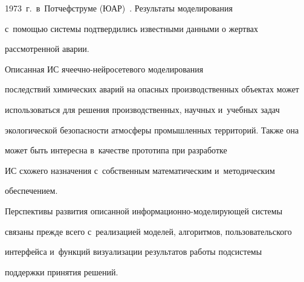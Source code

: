 1973~г.\ в~Потчефструме (ЮАР)~\cite{7-dud}. Результаты моделирования 


с~помощью системы подтвердились известными данными о жертвах 


рассмотренной аварии.








  


  Описанная ИС яче\-еч\-но-ней\-ро\-се\-те\-во\-го моделирования 


последствий химических аварий на опасных производственных объектах может 


использоваться для решения производственных, научных и~учебных задач 


экологической безопасности атмосферы промышленных территорий. Также она 


может быть интересна в~качестве прототипа при разработке 


ИС схожего назначения с~собственным математическим и~методическим 


обеспечением.


  


  Перспективы развития описанной информационно-мо\-де\-ли\-ру\-ющей системы 


связаны прежде всего с~реализацией моделей, алгоритмов, пользовательского 


интерфейса и~функций визуализации результатов работы подсистемы 


поддержки принятия решений.





\vspace*{-6pt}


  



